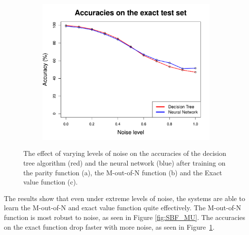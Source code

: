 \documentclass[letterpaper]{article} %
\begin{document}
\begin{figure}[p]
    \begin{subfigure}[t]{0.4\textwidth}
        \centering
        \includegraphics[width = 1 \linewidth]{Figures/SBF_EU.pdf}
        \caption{}
        \label{fig:SBF_EU}
    \end{subfigure}%
    \caption{The effect of varying levels of noise on the accuracies of the decision tree algorithm (red) and the neural network (blue) after training on the parity function (a), the M-out-of-N function (b) and the Exact value function (c).}
    \label{fig:SBF_noise}
\end{figure}

The results show that even under extreme levels of noise, the systems are able to learn the M-out-of-N and exact value function quite effectively.
\iftrue
The M-out-of-N function is most robust to noise, as seen in Figure \ref{fig:SBF_MU}. %
The accuracies on the exact function drop faster with more noise, as seen in Figure~\ref{fig:SBF_EU}. 
\end{document}
